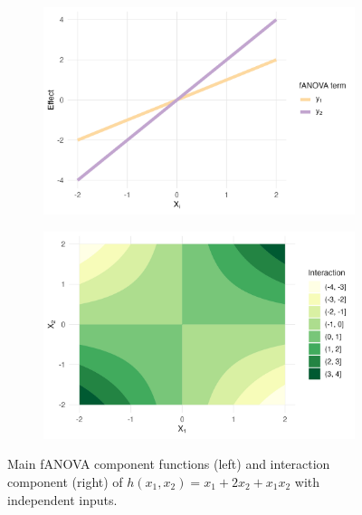\begin{figure}[htpb]
    \centering
    \begin{subfigure}[t]{0.49\textwidth}
        \centering
        \includegraphics[width=\textwidth]{images/experiment_section/running_example_a1p10_a2p20_a11p00_a22p00_a12p10_rhop00_main.png}
    \end{subfigure}%
    \hfill
    \begin{subfigure}[t]{0.49\textwidth}
        \centering
        \includegraphics[width=\textwidth]{images/experiment_section/running_example_a1p10_a2p20_a11p00_a22p00_a12p10_rhop00_interaction.png}
    \end{subfigure}
    \caption{Main fANOVA component functions (left) and interaction component (right) of $h(x_1, x_2) = x_1 + 2 x_2 + x_1 x_2$ with independent inputs.}
    \label{fig:running_ex_independent}
\end{figure}

